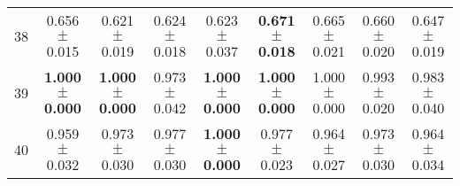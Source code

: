 \begin{table}[!ht]
{\begin{tabular}{r c c c c c c c c}
38 & 0.656 $\pm$ 0.015 & 0.621 $\pm$ 0.019 & 0.624 $\pm$ 0.018 & 0.623 $\pm$ 0.037 & \textbf{0.671 $\pm$ 0.018} & 0.665 $\pm$ 0.021 & 0.660 $\pm$ 0.020 & 0.647 $\pm$ 0.019 \\
39 & \textbf{1.000 $\pm$ 0.000} & \textbf{1.000 $\pm$ 0.000} & 0.973 $\pm$ 0.042 & \textbf{1.000 $\pm$ 0.000} & \textbf{1.000 $\pm$ 0.000} & 1.000 $\pm$ 0.000 & 0.993 $\pm$ 0.020 & 0.983 $\pm$ 0.040 \\
40 & 0.959 $\pm$ 0.032 & 0.973 $\pm$ 0.030 & 0.977 $\pm$ 0.030 & \textbf{1.000 $\pm$ 0.000} & 0.977 $\pm$ 0.023 & 0.964 $\pm$ 0.027 & 0.973 $\pm$ 0.030 & 0.964 $\pm$ 0.034 \\
\end{tabular}}
\end{table}
